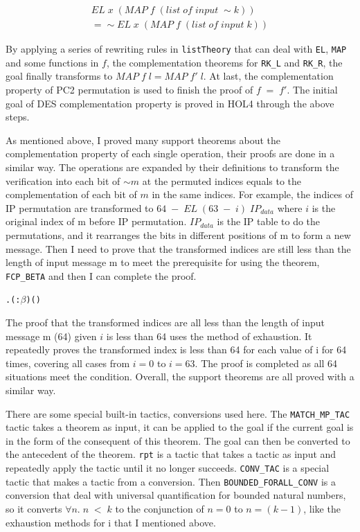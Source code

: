 \documentclass{article}
\begin{document}
\begin{multline*}
EL \; x \; (MAP \; f \; (list \; of \; input \; \sim k))\\
= \sim EL \; x \; (MAP \; f \; (list \; of \; input \; k))
\end{multline*}

By applying a series of rewriting rules in \verb|listTheory| that can deal with \verb|EL|, \verb|MAP| and some functions in $f$, the complementation
theorems for \verb|RK_L| and \verb|RK_R|, the goal finally transforms to $MAP\; f \;l = MAP\; f'\; l$. At last, the complementation property of PC2
permutation is used
to finish the proof of $f\;=\;f'$. The initial goal of DES complementation property is proved in HOL4 through the above steps.

As mentioned above, I proved many support theorems about the complementation property of each single operation, their proofs are
done in a similar way. The operations are expanded by their definitions to transform the verification into each bit of $\sim m$
at the permuted indices equals to the complementation of each bit of $m$ in the same indices. For example, the indices of IP
permutation are transformed to $64 \; - \; EL \; (63 \;-\;i) \; IP_{data}$ where $i$ is the original index of m before IP
permutation. $IP_{data}$ is the IP table to do the permutations, and it rearranges the bits in different positions of m
to form a new message. Then I need to prove that the transformed indices are still less than the length of input message m to
meet the prerequisite for using the theorem, \verb|FCP_BETA| and then I can complete the proof.

\begin{alltt}
\HOLTokenTurnstile{} \HOLSymConst{\HOLTokenForall{}}.  \HOLSymConst{\HOLTokenLt{}}  (:\ensuremath{\beta}) \HOLSymConst{\HOLTokenImp{}} ()    \HOLSymConst{=}  
\end{alltt}

The proof that the transformed indices are all less than the length of input message m (64) given $i$ is less than 64 uses
the method of exhaustion. It repeatedly proves the transformed index is less than 64 for each value of i for 64 times, covering
all cases from $i=0$ to $i=63$. The proof is completed as all 64 situations meet the condition. Overall, the support theorems are
all proved with a similar way.

There are some special built-in tactics, conversions used here. The \verb|MATCH_MP_TAC| tactic takes a theorem as input,
it can be applied to the goal if the current goal is in the form of the consequent of this theorem. The goal can then be
converted to the antecedent of the theorem. \verb|rpt| is a tactic that takes a tactic as input and repeatedly apply the tactic until
it no longer succeeds. \verb|CONV_TAC| is a special tactic that makes a tactic from a conversion. Then \verb|BOUNDED_FORALL_CONV| is a
conversion that deal with universal quantification for bounded natural numbers, so it converts $\forall n. \;n \; < \; k$ to
the conjunction of $n=0$ to $n=(k-1)$, like the exhaustion methods for i that I mentioned above.
\end{document}
